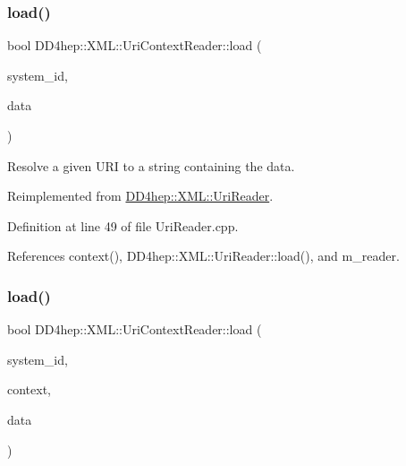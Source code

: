 \subsubsection{\texorpdfstring{load()}{load()}\hspace{0.1cm}{\footnotesize\ttfamily [1/2]}}
{\footnotesize\ttfamily bool D\+D4hep\+::\+X\+M\+L\+::\+Uri\+Context\+Reader\+::load (\begin{DoxyParamCaption}\item[{const std\+::string \&}]{system\+\_\+id,  }\item[{std\+::string \&}]{data }\end{DoxyParamCaption})\hspace{0.3cm}{\ttfamily [virtual]}}



Resolve a given U\+RI to a string containing the data. 



Reimplemented from \hyperlink{class_d_d4hep_1_1_x_m_l_1_1_uri_reader_a4cb644360608b580a1aaa4ccb9a8c7fa}{D\+D4hep\+::\+X\+M\+L\+::\+Uri\+Reader}.



Definition at line 49 of file Uri\+Reader.\+cpp.



References context(), D\+D4hep\+::\+X\+M\+L\+::\+Uri\+Reader\+::load(), and m\+\_\+reader.

\hypertarget{class_d_d4hep_1_1_x_m_l_1_1_uri_context_reader_a4a092a836c08154d7d787f9244701944}{}\label{class_d_d4hep_1_1_x_m_l_1_1_uri_context_reader_a4a092a836c08154d7d787f9244701944} 
\subsubsection{\texorpdfstring{load()}{load()}\hspace{0.1cm}{\footnotesize\ttfamily [2/2]}}
{\footnotesize\ttfamily bool D\+D4hep\+::\+X\+M\+L\+::\+Uri\+Context\+Reader\+::load (\begin{DoxyParamCaption}\item[{const std\+::string \&}]{system\+\_\+id,  }\item[{\hyperlink{struct_d_d4hep_1_1_x_m_l_1_1_uri_reader_1_1_user_context}{User\+Context} $\ast$}]{context,  }\item[{std\+::string \&}]{data }\end{DoxyParamCaption})\hspace{0.3cm}{\ttfamily [virtual]}}



